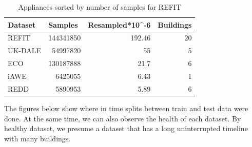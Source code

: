 \begin{table}[H]
    \centering
    \begin{tabular}{|l|r|r|r|}
    \hline
    \textbf{Dataset} & \multicolumn{1}{l|}{\textbf{Samples}} & \multicolumn{1}{l|}{\textbf{Resampled*10\textasciicircum{}-6}} & \multicolumn{1}{l|}{\textbf{Buildings}} \\ \hline
    REFIT            & 144341850                             & 192.46                                                         & 20                                      \\ \hline
    UK-DALE          & 54997820                              & 55                                                             & 5                                       \\ \hline
    ECO              & 130187888                             & 21.7                                                           & 6                                       \\ \hline
    iAWE             & 6425055                               & 6.43                                                           & 1                                       \\ \hline
    REDD             & 5890953                               & 5.89                                                           & 6                                       \\ \hline
    \end{tabular}
    \caption{Appliances sorted by number of samples for REFIT}
    \label{tab:dataset_analysis}
\end{table}

The figures below show where in time splits between train and test data were done.
At the same time, we can also observe the health of each dataset.
By healthy dataset, we presume a dataset that has a long uninterrupted timeline with many buildings.


